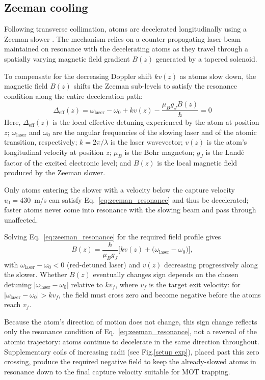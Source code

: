 \subsection{Zeeman cooling}
Following transverse collimation, atoms are decelerated longitudinally using a
Zeeman slower \cite{phillips_laser_1982}. The mechanism relies on a
counter-propagating laser beam maintained on resonance with the decelerating
atoms as they travel through a spatially varying magnetic field gradient $B(z)$
generated by a tapered solenoid.

To compensate for the decreasing Doppler shift $kv(z)$ as atoms slow down, the
magnetic field $B(z)$ shifts the Zeeman sub-levels to satisfy the resonance
condition along the entire deceleration path:
\begin{equation}
\Delta_{\text{eff}}(z) = \omega_{\text{laser}} - \omega_0 + k v(z) - \frac{\mu_B g_J B(z)}{\hbar} = 0
\label{eq:zeeman_resonance}
\end{equation}
Here, $\Delta_{\text{eff}}(z)$ is the local effective detuning experienced by the atom at position $z$; $\omega_{\text{laser}}$ and $\omega_0$ are the angular frequencies of the slowing laser and of the atomic transition, respectively; $k = 2\pi/\lambda$ is the laser wavevector; $v(z)$ is the atom's longitudinal velocity at position $z$; $\mu_B$ is the Bohr magneton; $g_J$ is the Land\'e factor of the excited electronic level; and $B(z)$ is the local magnetic field produced by the Zeeman slower.

Only atoms entering the slower with a velocity below the capture velocity
$v_0=430$~m/s can satisfy Eq.~\ref{eq:zeeman_resonance} and thus be decelerated;
faster atoms never come into resonance with the slowing beam and pass through
unaffected.

Solving Eq.~\ref{eq:zeeman_resonance} for the required field profile gives
\begin{equation}
B(z) = \frac{\hbar}{\mu_B g_J}\Big[k v(z) + \big(\omega_{\text{laser}} - \omega_0\big)\Big],
\label{eq:Bz_profile}
\end{equation}
with $\omega_{\text{laser}} - \omega_0 < 0$ (red-detuned laser) and $v(z)$
decreasing progressively along the slower. Whether $B(z)$ eventually changes sign
depends on the chosen detuning $|\omega_{\text{laser}}-\omega_0|$ relative to
$kv_f$, where $v_f$ is the target exit velocity: for
$|\omega_{\text{laser}}-\omega_0| > kv_f$, the field must cross zero and become
negative before the atoms reach $v_f$. 

Because the atom's direction of motion does not change, this sign change reflects
only the resonance condition of Eq.~\ref{eq:zeeman_resonance}, not a reversal of
the atomic trajectory: atoms continue to decelerate in the same direction
throughout. Supplementary coils of increasing radii (see Fig.\ref{setup exp}), placed past this zero
crossing, produce the required negative field to keep the already-slowed atoms in
resonance down to the final capture velocity suitable for MOT trapping.

